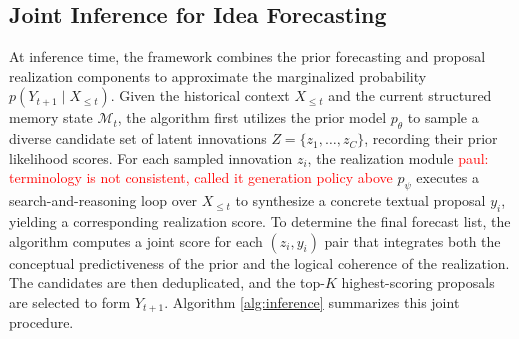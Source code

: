 \documentclass{article} %
\newcommand{\paul}[1]{\textcolor{red}{paul: #1}}
\begin{document}
\subsection{Joint Inference for Idea Forecasting}
At inference time, the framework combines the prior forecasting and proposal realization components to approximate the marginalized probability $p(Y_{t+1} \mid X_{\le t})$. Given the historical context $X_{\le t}$ and the current structured memory state $\mathcal{M}_t$, the algorithm first utilizes the prior model $p_\theta$ to sample a diverse candidate set of latent innovations $Z = \{z_1, \dots, z_C\}$, recording their prior likelihood scores. For each sampled innovation $z_i$, the realization module \paul{terminology is not consistent, called it generation policy above} $p_\psi$ executes a search-and-reasoning loop over $X_{\le t}$ to synthesize a concrete textual proposal $y_i$, yielding a corresponding realization score. To determine the final forecast list, the algorithm computes a joint score for each $(z_i, y_i)$ pair that integrates both the conceptual predictiveness of the prior and the logical coherence of the realization. The candidates are then deduplicated, and the top-$K$ highest-scoring proposals are selected to form $Y_{t+1}$. Algorithm \ref{alg:inference} summarizes this joint procedure.
\end{document}
